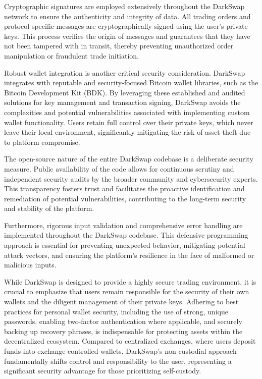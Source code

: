 \documentclass{article}
\begin{document}
Cryptographic signatures are employed extensively throughout the DarkSwap network to ensure the authenticity and integrity of data. All trading orders and protocol-specific messages are cryptographically signed using the user's private keys. This process verifies the origin of messages and guarantees that they have not been tampered with in transit, thereby preventing unauthorized order manipulation or fraudulent trade initiation.

Robust wallet integration is another critical security consideration. DarkSwap integrates with reputable and security-focused Bitcoin wallet libraries, such as the Bitcoin Development Kit (BDK). By leveraging these established and audited solutions for key management and transaction signing, DarkSwap avoids the complexities and potential vulnerabilities associated with implementing custom wallet functionality. Users retain full control over their private keys, which never leave their local environment, significantly mitigating the risk of asset theft due to platform compromise.

The open-source nature of the entire DarkSwap codebase is a deliberate security measure. Public availability of the code allows for continuous scrutiny and independent security audits by the broader community and cybersecurity experts. This transparency fosters trust and facilitates the proactive identification and remediation of potential vulnerabilities, contributing to the long-term security and stability of the platform.

Furthermore, rigorous input validation and comprehensive error handling are implemented throughout the DarkSwap codebase. This defensive programming approach is essential for preventing unexpected behavior, mitigating potential attack vectors, and ensuring the platform's resilience in the face of malformed or malicious inputs.

While DarkSwap is designed to provide a highly secure trading environment, it is crucial to emphasize that users remain responsible for the security of their own wallets and the diligent management of their private keys. Adhering to best practices for personal wallet security, including the use of strong, unique passwords, enabling two-factor authentication where applicable, and securely backing up recovery phrases, is indispensable for protecting assets within the decentralized ecosystem. Compared to centralized exchanges, where users deposit funds into exchange-controlled wallets, DarkSwap's non-custodial approach fundamentally shifts control and responsibility to the user, representing a significant security advantage for those prioritizing self-custody.
\end{document}
